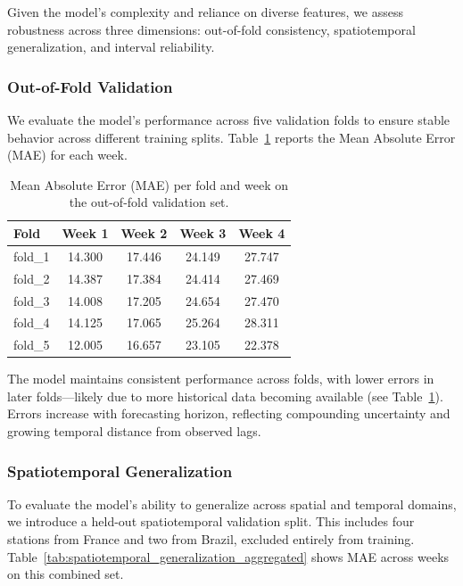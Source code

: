 \documentclass[a4paper,12pt]{article}
\begin{document}
Given the model's complexity and reliance on diverse features, we assess robustness across three dimensions: out-of-fold consistency, spatiotemporal generalization, and interval reliability.

\subsubsection{Out-of-Fold Validation}

We evaluate the model's performance across five validation folds to ensure stable behavior across different training splits. Table~\ref{tab:mae_per_fold_week} reports the Mean Absolute Error (MAE) for each week.

\begin{table}[ht]
\centering
\begin{tabular}{lcccc}
\hline
\textbf{Fold} & \textbf{Week 1} & \textbf{Week 2} & \textbf{Week 3} & \textbf{Week 4} \\
\hline
fold\_1 & 14.300 & 17.446 & 24.149 & 27.747 \\
fold\_2 & 14.387 & 17.384 & 24.414 & 27.469 \\
fold\_3 & 14.008 & 17.205 & 24.654 & 27.470 \\
fold\_4 & 14.125 & 17.065 & 25.264 & 28.311 \\
fold\_5 & 12.005 & 16.657 & 23.105 & 22.378 \\
\hline
\end{tabular}
\caption{Mean Absolute Error (MAE) per fold and week on the out-of-fold validation set.}
\label{tab:mae_per_fold_week}
\end{table}

\noindent The model maintains consistent performance across folds, with lower errors in later folds—likely due to more historical data becoming available (see Table~\ref{tab:mae_per_fold_week}). Errors increase with forecasting horizon, reflecting compounding uncertainty and growing temporal distance from observed lags.

\subsubsection{Spatiotemporal Generalization}

To evaluate the model's ability to generalize across spatial and temporal domains, we introduce a held-out spatiotemporal validation split. This includes four stations from France and two from Brazil, excluded entirely from training. Table~\ref{tab:spatiotemporal_generalization_aggregated} shows MAE across weeks on this combined set.
\end{document}
